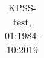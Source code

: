\begin{table}[!htpb]
\centering
\caption{KPSS-test, 01:1984-10:2019}
\label{tab:kpss}
\begin{adjustbox}{max width=\textwidth}
\begin{tabular}{@{}lllllll@{}}
\toprule

\end{tabular}
\end{adjustbox}
\end{table}
